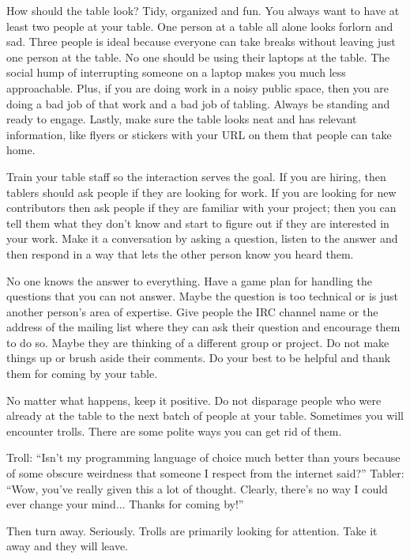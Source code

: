 How should the table look? Tidy, organized and fun. You always want to have at least two people at your table. One person at a table all alone looks forlorn and sad. Three people is ideal because everyone can take breaks without leaving just one person at the table. No one should be using their laptops at the table. The social hump of interrupting someone on a laptop makes you much less approachable. Plus, if you are doing work in a noisy public space, then you are doing a bad job of that work and a bad job of tabling. Always be standing and ready to engage. Lastly, make sure the table looks neat and has relevant information, like flyers or stickers with your URL on them that people can take home. 

Train your table staff so the interaction serves the goal. If you are hiring, then tablers should ask people if they are looking for work. If you are looking for new contributors then ask people if they are familiar with your project; then you can tell them what they don’t know and start to figure out if they are interested in your work. Make it a conversation by asking a question, listen to the answer and then respond in a way that lets the other person know you heard them. 

No one knows the answer to everything. Have a game plan for handling the questions that you can not answer. Maybe the question is too technical or is just another person’s area of expertise. Give people the IRC channel name or the address of the mailing list where they can ask their question and encourage them to do so. Maybe they are thinking of a different group or project. Do not make things up or brush aside their comments. Do your best to be helpful and thank them for coming by your table.

No matter what happens, keep it positive. Do not disparage people who were already at the table to the next batch of people at your table. Sometimes you will encounter trolls. There are some polite ways you can get rid of them. 

Troll: “Isn’t my programming language of choice much better than yours because of some obscure weirdness that someone I respect from the internet said?”
Tabler: “Wow, you've really given this a lot of thought. Clearly, there's no way I could ever change your mind... Thanks for coming by!”

Then turn away. Seriously. Trolls are primarily looking for attention. Take it away and they will leave. 

